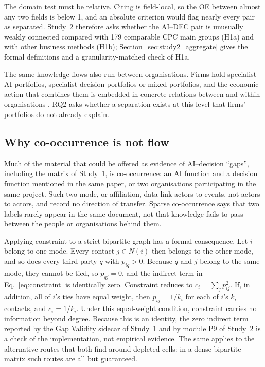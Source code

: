 The domain test must be relative. Citing is field-local, so the OE between almost any two fields is below 1, and an absolute criterion would flag nearly every pair as separated. Study~2 therefore asks whether the AI--DEC pair is unusually weakly connected compared with 179 comparable CPC main groups (H1a) and with other business methods (H1b); Section~\ref{sec:study2_aggregate} gives the formal definitions and a granularity-matched check of H1a.

The same knowledge flows also run between organisations. Firms hold specialist AI portfolios, specialist decision portfolios or mixed portfolios, and the economic action that combines them is embedded in concrete relations between and within organisations \citep{granovetter1985economic}. RQ2 asks whether a separation exists at this level that firms' portfolios do not already explain.

\subsection{Why co-occurrence is not flow}
\label{sec:theory_cooccurrence}

Much of the material that could be offered as evidence of AI--decision ``gaps'', including the matrix of Study~1, is co-occurrence: an AI function and a decision function mentioned in the same paper, or two organisations participating in the same project. Such two-mode, or affiliation, data link actors to events, not actors to actors, and record no direction of transfer. Sparse co-occurrence says that two labels rarely appear in the same document, not that knowledge fails to pass between the people or organisations behind them.

Applying constraint to a strict bipartite graph has a formal consequence. Let $i$ belong to one mode. Every contact $j \in N(i)$ then belongs to the other mode, and so does every third party $q$ with $p_{iq} > 0$. Because $q$ and $j$ belong to the same mode, they cannot be tied, so $p_{qj} = 0$, and the indirect term in Eq.~\eqref{eq:constraint} is identically zero. Constraint reduces to $c_i = \sum_{j} p_{ij}^{2}$. If, in addition, all of $i$'s ties have equal weight, then $p_{ij} = 1/k_i$ for each of $i$'s $k_i$ contacts, and $c_i = 1/k_i$. Under this equal-weight condition, constraint carries no information beyond degree. Because this is an identity, the zero indirect term reported by the Gap Validity sidecar of Study~1 and by module P9 of Study~2 is a check of the implementation, not empirical evidence. The same applies to the alternative routes that both find around depleted cells: in a dense bipartite matrix such routes are all but guaranteed.

